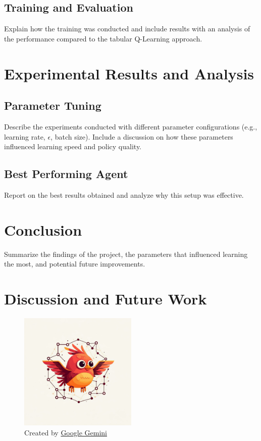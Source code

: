 \documentclass[a4paper,12pt]{article}
\begin{document}
\subsection{Training and Evaluation}
Explain how the training was conducted and include results with an analysis of the performance compared to the tabular Q-Learning approach.

\section{Experimental Results and Analysis}
\subsection{Parameter Tuning}
Describe the experiments conducted with different parameter configurations (e.g., learning rate, \(\epsilon\), batch size). Include a discussion on how these parameters influenced learning speed and policy quality.

\subsection{Best Performing Agent}
Report on the best results obtained and analyze why this setup was effective.

\section{Conclusion}
Summarize the findings of the project, the parameters that influenced learning the most, and potential future improvements.





\section{Discussion and Future Work}

\begin{figure}[H]
    \centering
    \includegraphics[width=0.5\textwidth]{ai_image.jpg}
    \caption{Created by \href{https://gemini.google.com/}{Google Gemini}}
    \label{fig:learning_curves}
\end{figure}
\end{document}
